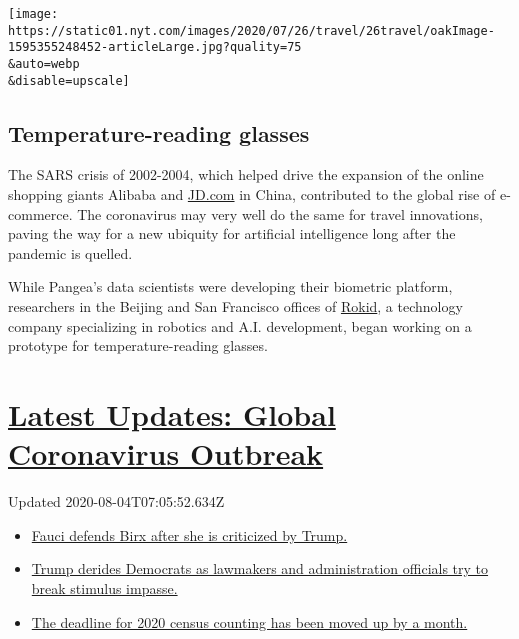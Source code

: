 \texttt{[image: https://static01.nyt.com/images/2020/07/26/travel/26travel/oakImage-1595355248452-articleLarge.jpg?quality=75\\\&auto=webp\\\&disable=upscale]}

\hypertarget{temperature-reading-glasses}{%
\subsection{Temperature-reading
glasses}\label{temperature-reading-glasses}}

The SARS crisis of 2002-2004, which helped drive the expansion of the
online shopping giants Alibaba and \href{http://JD.com}{JD.com} in
China, contributed to the global rise of e-commerce. The coronavirus may
very well do the same for travel innovations, paving the way for a new
ubiquity for artificial intelligence long after the pandemic is quelled.

While Pangea's data scientists were developing their biometric platform,
researchers in the Beijing and San Francisco offices of
\href{https://www.rokid.com/}{Rokid}, a technology company specializing
in robotics and A.I. development, began working on a prototype for
temperature-reading glasses.

\hypertarget{latest-updates-global-coronavirus-outbreak}{%
\section{\texorpdfstring{\href{https://www.nytimes.com/2020/08/03/world/coronavirus-covid-19.html?action=click\&pgtype=Article\&state=default\&region=MAIN_CONTENT_1\&context=storylines_live_updates}{Latest
Updates: Global Coronavirus
Outbreak}}{Latest Updates: Global Coronavirus Outbreak}}\label{latest-updates-global-coronavirus-outbreak}}

Updated 2020-08-04T07:05:52.634Z

\begin{itemize}
\tightlist
\item
  \href{https://www.nytimes.com/2020/08/03/world/coronavirus-covid-19.html?action=click\&pgtype=Article\&state=default\&region=MAIN_CONTENT_1\&context=storylines_live_updates\#link-4547638f}{Fauci
  defends Birx after she is criticized by Trump.}
\item
  \href{https://www.nytimes.com/2020/08/03/world/coronavirus-covid-19.html?action=click\&pgtype=Article\&state=default\&region=MAIN_CONTENT_1\&context=storylines_live_updates\#link-15e7f995}{Trump
  derides Democrats as lawmakers and administration officials try to
  break stimulus impasse.}
\item
  \href{https://www.nytimes.com/2020/08/03/world/coronavirus-covid-19.html?action=click\&pgtype=Article\&state=default\&region=MAIN_CONTENT_1\&context=storylines_live_updates\#link-e5a2cda}{The
  deadline for 2020 census counting has been moved up by a month.}
\end{itemize}

